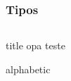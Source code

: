 \begin{frame}[fragile]
    \frametitle{Tipos}

    {
        \begin{block}{}
        \footnotesize
        \inputminted{cpp}{codigos/tipos.cpp}    
    \end{block}
    }

    \begin{block}{title}
        opa teste

        alphabetic


    \end{block}




    
\end{frame}
